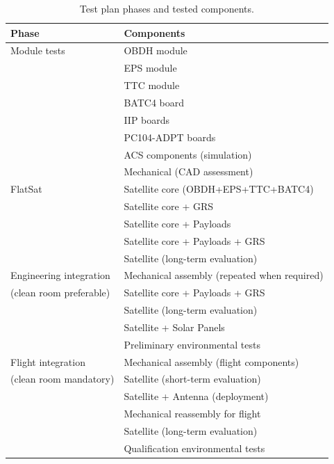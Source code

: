 \begin{table}[!h]
    \begin{center}
        \begin{tabular}{ll}
            \toprule[1.5pt]
            \textbf{Phase}    & \textbf{Components}       \\
            \midrule
            Module tests             & OBDH module \\
                                     & EPS module \\
                                     & TTC module \\
                                     & BATC4 board \\
                                     & IIP boards \\
                                     & PC104-ADPT boards \\
                                     & ACS components (simulation) \\
                                     & Mechanical (CAD assessment) \\
            \midrule
            FlatSat                  & Satellite core (OBDH+EPS+TTC+BATC4) \\
                                     & Satellite core + GRS \\
                                     & Satellite core + Payloads \\
                                     & Satellite core + Payloads + GRS \\
                                     & Satellite (long-term evaluation) \\
            \midrule
            Engineering integration  & Mechanical assembly (repeated when required) \\
            (clean room preferable)  & Satellite core + Payloads + GRS \\
                                     & Satellite (long-term evaluation) \\
                                     & Satellite + Solar Panels \\
                                     & Preliminary environmental tests \\ 
            \midrule
            Flight integration       & Mechanical assembly (flight components) \\
            (clean room mandatory)   & Satellite (short-term evaluation) \\
                                     & Satellite + Antenna (deployment) \\
                                     & Mechanical reassembly for flight \\
                                     & Satellite (long-term evaluation) \\
                                     & Qualification environmental tests \\ 
            \bottomrule[1.5pt]
        \end{tabular}
        \caption{Test plan phases and tested components.}
        \label{tab:test-plan}
    \end{center}
\end{table}

